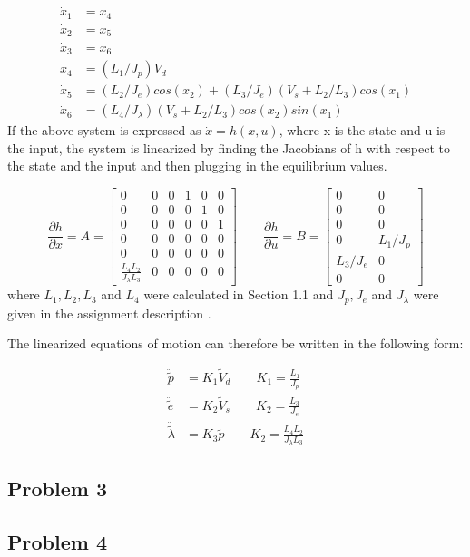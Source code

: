 \begin{subequations}
  \begin{align}
    \dot{x}_1 &= x_4 \\
    \dot{x}_2 &= x_5 \\
    \dot{x}_3 &= x_6 \\
    \dot{x}_4 &= (L_1/J_p) V_d \\
    \dot{x}_5 &= (L_2/J_e)cos(x_2) + (L_3/J_e)(V_s + L_2 / L_3)cos(x_1) \\
    \dot{x}_6 &= (L_4 / J_\lambda) (V_s + L_2 / L_3)cos(x_2)sin(x_1)
  \end{align}
\end{subequations}
If the above system is expressed as $\dot{x} = h(x, u)$, where x is
the state and u is the input, the system is linearized by finding the
Jacobians of h with respect to the state and the input and then
plugging in the equilibrium values.

\begin{equation}
  \frac{\partial h}{\partial x} = A =
  \begin{bmatrix}
    0 & 0 & 0 & 1 & 0 & 0 \\
    0 & 0 & 0 & 0 & 1 & 0 \\
    0 & 0 & 0 & 0 & 0 & 1 \\
    0 & 0 & 0 & 0 & 0 & 0 \\
    0 & 0 & 0 & 0 & 0 & 0 \\
    \frac{L_4L_2}{J_\lambda L_3} & 0 & 0 & 0 & 0 & 0
  \end{bmatrix}
  \qquad
  \frac{\partial h}{\partial u} = B =
  \begin{bmatrix}
    0 & 0 \\
    0 & 0 \\
    0 & 0 \\
    0 & L_1/J_p \\
    L_3/J_e & 0 \\
    0 & 0
  \end{bmatrix}
\end{equation}
where $L_1, L_2, L_3$ and $L_4$ were calculated in Section 1.1
 and $J_p, J_e$ and $J_\lambda$ were given in
the assignment description .

The linearized equations of motion can therefore be written in the
following form:

\begin{subequations}
  \begin{align}
    \ddot{\tilde{p}} &= K_1\tilde{V}_d \qquad K_1 = \frac{L_1}{J_p}\\
    \ddot{\tilde{e}} &= K_2\tilde{V}_s \qquad K_2 = \frac{L_3}{J_e}\\
    \ddot{\tilde{\lambda}} &= K_3\tilde{p} \qquad K_2 = \frac{L_4L_2}{J_\lambda L_3}
  \end{align}
\end{subequations}
\subsection{Problem 3}
\subsection{Problem 4}

